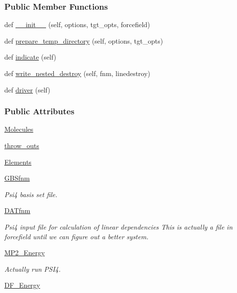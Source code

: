 \subsubsection*{Public Member Functions}
\begin{DoxyCompactItemize}
\item 
def \hyperlink{classsrc_1_1psi4io_1_1THCDF__Psi4_a7d4a0b9b75eb7caa84888df5d1903f04}{\+\_\+\+\_\+init\+\_\+\+\_\+} (self, options, tgt\+\_\+opts, forcefield)
\item 
def \hyperlink{classsrc_1_1psi4io_1_1THCDF__Psi4_a3201f4428d75dd17f9fed6e726117da6}{prepare\+\_\+temp\+\_\+directory} (self, options, tgt\+\_\+opts)
\item 
def \hyperlink{classsrc_1_1psi4io_1_1THCDF__Psi4_ac1e457fe0a426c122707e8f8937b3379}{indicate} (self)
\item 
def \hyperlink{classsrc_1_1psi4io_1_1THCDF__Psi4_a4fb94880d038f875460abd67e18bdf43}{write\+\_\+nested\+\_\+destroy} (self, fnm, linedestroy)
\item 
def \hyperlink{classsrc_1_1psi4io_1_1THCDF__Psi4_a88a67530b2c9d2a292fc4422930475a1}{driver} (self)
\end{DoxyCompactItemize}
\subsubsection*{Public Attributes}
\begin{DoxyCompactItemize}
\item 
\hyperlink{classsrc_1_1psi4io_1_1THCDF__Psi4_ad6c23d45f1ef61411786511a93ba7915}{Molecules}
\item 
\hyperlink{classsrc_1_1psi4io_1_1THCDF__Psi4_ac96b467db68c670a676f358a3d638803}{throw\+\_\+outs}
\item 
\hyperlink{classsrc_1_1psi4io_1_1THCDF__Psi4_a82c2668ab89ffba239e31582ac903aa2}{Elements}
\item 
\hyperlink{classsrc_1_1psi4io_1_1THCDF__Psi4_aea313365961c9298848ea616d9c4848f}{G\+B\+Sfnm}
\begin{DoxyCompactList}\small\item\em Psi4 basis set file. \end{DoxyCompactList}\item 
\hyperlink{classsrc_1_1psi4io_1_1THCDF__Psi4_a25b5e4a9c2d9d771d419fcdf0803a08a}{D\+A\+Tfnm}
\begin{DoxyCompactList}\small\item\em Psi4 input file for calculation of linear dependencies This is actually a file in \textquotesingle{}forcefield\textquotesingle{} until we can figure out a better system. \end{DoxyCompactList}\item 
\hyperlink{classsrc_1_1psi4io_1_1THCDF__Psi4_af2a60fba0aa2ed33acb19569b1e2c32e}{M\+P2\+\_\+\+Energy}
\begin{DoxyCompactList}\small\item\em Actually run P\+S\+I4. \end{DoxyCompactList}\item 
\hyperlink{classsrc_1_1psi4io_1_1THCDF__Psi4_a9991811b534a0015ad2eb6e5a2b4f477}{D\+F\+\_\+\+Energy}
\end{DoxyCompactItemize}


